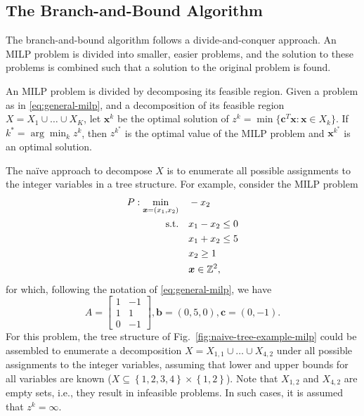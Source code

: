 \subsection{The Branch-and-Bound Algorithm}

The branch-and-bound algorithm follows a divide-and-conquer approach.
An MILP problem is divided into smaller, easier problems, and the solution to these problems is combined such that a solution to the original problem is found.

An MILP problem is divided by decomposing its feasible region.
Given a problem as in \eqref{eq:general-milp}, and a decomposition of its feasible region $X=X_1\cup \ldots\cup X_K$, let $\bm{x}^{k}$ be the optimal solution of $z^{k}=\min\{ \bm{c}^{T}\bm{x} : \bm{x}\in X_k \}$.
If $k^{*}= \arg\min_k z^{k}$, then $z^{k^*}$ is the optimal value of the MILP problem and $\bm{x}^{k^*}$ is an optimal solution.

The naïve approach to decompose $X$ is to enumerate all possible assignments to the integer variables in a tree structure.
For example, consider the MILP problem
\begin{equation}\label{eq:example-milp}
\begin{split}
    P: \min_{\bm{x}=(x_1,x_2)} \quad & -x_2 \\
    \textrm{s.t.} \quad & x_1 - x_2\le 0 \\
      & x_1+x_2 \le 5 \\
      & x_2 \ge 1 \\
      & \bm{x} \in \mathbb{Z}^2
,\end{split}
\end{equation}
for which, following the notation of \eqref{eq:general-milp}, we have \[
A=\begin{bmatrix} 1 & -1 \\ 1 & 1 \\0 & -1 \end{bmatrix}, \bm{b} = (0, 5, 0), \bm{c} = (0, -1) 
.\]
For this problem, the tree structure of Fig.~\ref{fig:naive-tree-example-milp} could be assembled to enumerate a decomposition $X=X_{1,1}\cup \ldots\cup X_{4,2}$ under all possible assignments to the integer variables, assuming that lower and upper bounds for all variables are known ($X\subseteq \left\{ 1,2,3,4 \right\} \times \left\{ 1,2 \right\} $).
Note that $X_{1,2}$ and $X_{4,2}$ are empty sets, i.e., they result in infeasible problems.
In such cases, it is assumed that $z^{k}=\infty$.


